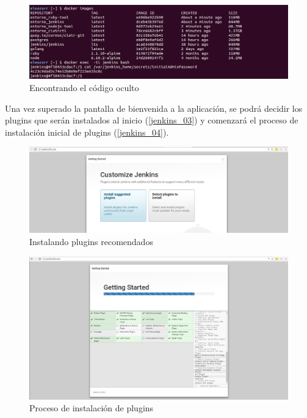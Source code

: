 \begin{figure}[htbp]
	\centering
	\includegraphics[width=1.0\linewidth]
	{desarrollo/figuras/jenkins_02.png}
	\caption{Encontrando el código oculto}
	\label{jenkins_02}
\end{figure}

Una vez superado la pantalla de bienvenida a la aplicación, se podrá decidir los plugins que serán instalados al inicio (\autoref{jenkins_03}) y comenzará el proceso de instalación inicial de plugins (\autoref{jenkins_04}).


\begin{figure}[htbp]
	\centering
	\includegraphics[width=1.0\linewidth]
	{desarrollo/figuras/jenkins_03.png}
	\caption{Instalando plugins recomendados}
	\label{jenkins_03}
\end{figure}

\begin{figure}[htbp]
	\centering
	\includegraphics[width=1.0\linewidth]
	{desarrollo/figuras/jenkins_04.png}
	\caption{Proceso de instalación de plugins}
	\label{jenkins_04}
\end{figure}

